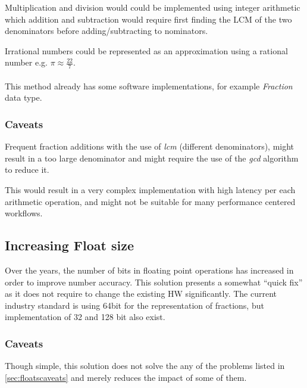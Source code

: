 \documentclass[10pt]{article}
\begin{document}
Multiplication and division would could be implemented using integer arithmetic
which addition and subtraction would require first finding the LCM of the two
denominators before adding/subtracting to nominators.

Irrational numbers could be represented as an approximation using a rational
number e.g. $\pi \approx \frac{22}{7}$.

\paragraph{}
This method already has some software implementations, for example
\textit{Fraction} data type.

\subsubsection{Caveats}\label{sec:caveats}

Frequent fraction additions with the use of \textit{lcm} (different
denominators), might result in a too large denominator and might require the use
of the \textit{gcd} algorithm to reduce it.

This would result in a very complex implementation with high latency per each
arithmetic operation, and might not be suitable for many performance centered workflows.

\subsection{Increasing Float size}\label{sec:increasefloat}

Over the years, the number of bits in floating point operations has increased in
order to improve number accuracy. This solution presents a somewhat ``quick fix''
as it does not require to change the existing HW significantly.
The current industry standard is using 64bit for the representation of
fractions, but implementation of 32 and 128 bit also exist.

\subsubsection{Caveats}\label{sec:caveats-1}

Though simple, this solution does not solve the any of the problems listed in
\autoref{sec:floatscaveats} and merely reduces the impact of some of them.
\end{document}
